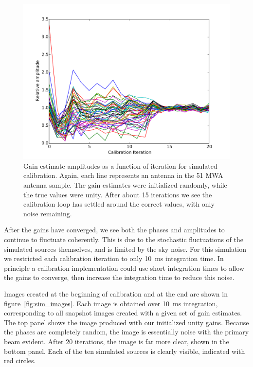 \documentclass[a4paper,fleqn,usenatbib]{mnras}
\begin{document}
\begin{figure}
\begin{center}
\includegraphics[width=\columnwidth]{fig4.pdf}
\caption{Gain estimate amplitudes as a function of iteration for simulated calibration. Again, 
each line represents an antenna in the 51 MWA antenna sample. The gain estimates were 
initialized randomly, while the true values were unity. After about 15 iterations we see the 
calibration loop has settled around the correct values, with only noise remaining.}
\label{fig:sim_amp}
\end{center}
\end{figure}

After the gains have converged, we see both the phases and amplitudes to continue to 
fluctuate coherently. This is due to the stochastic fluctuations of the simulated sources 
themselves, and is limited by the sky noise. For this simulation we restricted each calibration 
iteration to only 10~ms integration time. In principle a calibration implementation could use 
short integration times to allow the gains to converge, then increase the integration time to 
reduce this noise.

Images created at the beginning of calibration and at the end are shown in 
figure~\ref{fig:sim_images}. Each image is obtained over 10~ms integration, corresponding to 
all snapshot images created with a given set of gain estimates. The top panel shows the image 
produced with our initialized unity gains. Because the phases are completely random, the 
image is essentially noise with the primary beam evident. After 20 iterations, the image is far 
more clear, shown in the bottom panel. Each of the ten simulated sources is clearly visible, 
indicated with red circles. 
\end{document}
